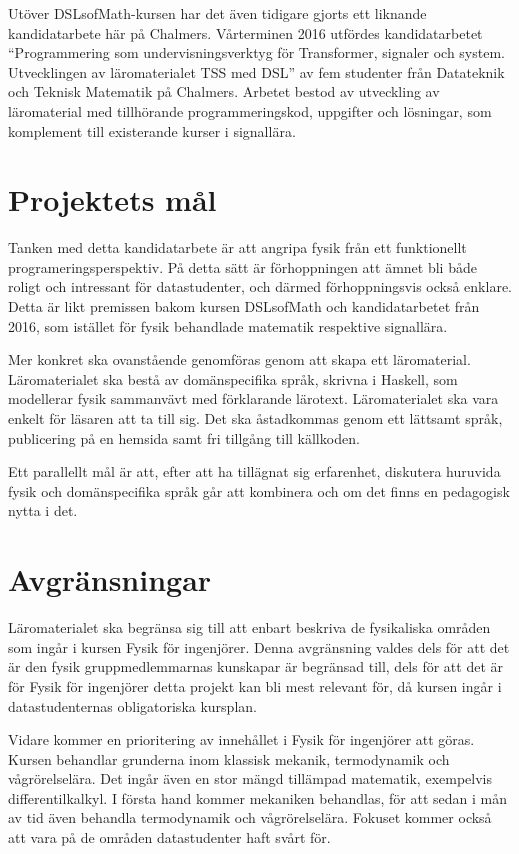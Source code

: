 \begin{draft}
Utöver DSLsofMath-kursen har det även tidigare gjorts ett liknande kandidatarbete 
här på Chalmers. Vårterminen 2016 utfördes kandidatarbetet ``Programmering som
undervisningsverktyg för Transformer, signaler och system. Utvecklingen av
läromaterialet TSS med DSL'' av fem studenter från Datateknik och Teknisk
Matematik på Chalmers. Arbetet bestod av utveckling av läromaterial med
tillhörande programmeringskod, uppgifter och lösningar, som komplement till
existerande kurser i signallära.\cite{kandidat2016}

\section{Projektets mål}

Tanken med detta kandidatarbete är att angripa fysik från ett funktionellt
programeringsperspektiv. På detta sätt är förhoppningen att ämnet bli både
roligt och intressant för datastudenter, och därmed förhoppningsvis också
enklare. Detta är likt premissen bakom kursen DSLsofMath och kandidatarbetet
från 2016, som istället för fysik behandlade matematik respektive signallära.

Mer konkret ska ovanstående genomföras genom att skapa ett läromaterial.
Läromaterialet ska bestå av 
domänspecifika språk, skrivna
i Haskell, som
modellerar fysik sammanvävt med förklarande lärotext. Läromaterialet ska vara
enkelt för läsaren att ta till sig. Det ska åstadkommas genom ett lättsamt
språk, publicering på en hemsida samt fri tillgång till källkoden.

Ett parallellt mål är att, efter att ha tillägnat sig erfarenhet, diskutera
huruvida fysik och domänspecifika språk går att kombinera och om det finns en
pedagogisk nytta i det.

\section{Avgränsningar}\label{sec:avgransningar}

Läromaterialet ska begränsa sig till att enbart beskriva de fysikaliska områden
som ingår i kursen Fysik för ingenjörer. Denna avgränsning valdes dels för att
det är den fysik gruppmedlemmarnas kunskapar är begränsad till, dels för att
det är för Fysik för ingenjörer detta projekt kan bli mest relevant för, då
kursen ingår i datastudenternas obligatoriska kursplan.

Vidare kommer en prioritering av innehållet i Fysik för ingenjörer att göras.
Kursen behandlar grunderna inom klassisk mekanik, termodynamik och
vågrörelselära. Det ingår även en stor mängd tillämpad matematik, exempelvis
differentilkalkyl. I första hand kommer mekaniken behandlas, för att sedan i mån
av tid även behandla termodynamik och vågrörelselära. Fokuset kommer också att
vara på de områden datastudenter haft svårt för.


\end{draft}
